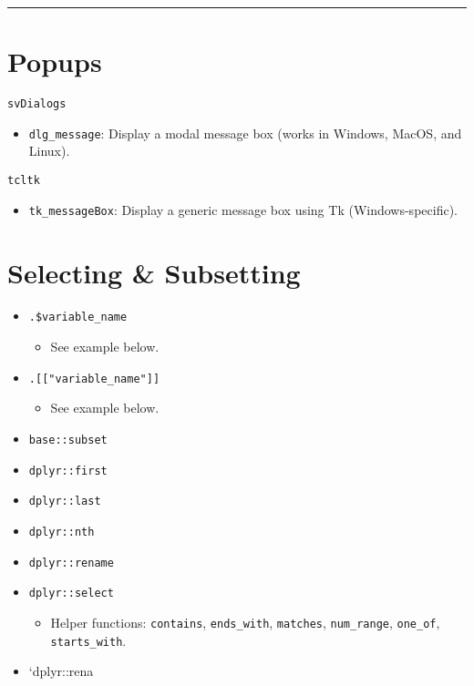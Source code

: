 \documentclass[]{book}
\providecommand{\tightlist}{%
  \setlength{\itemsep}{0pt}\setlength{\parskip}{0pt}}
\begin{document}
\begin{center}\rule{0.5\linewidth}{\linethickness}\end{center}

\hypertarget{popups}{%
\section{Popups}\label{popups}}

\texttt{svDialogs}

\begin{itemize}
\tightlist
\item
  \texttt{dlg\_message}: Display a modal message box (works in Windows, MacOS, and Linux).
\end{itemize}

\texttt{tcltk}

\begin{itemize}
\tightlist
\item
  \texttt{tk\_messageBox}: Display a generic message box using Tk (Windows-specific).
\end{itemize}

\hypertarget{selecting-subsetting}{%
\section{Selecting \& Subsetting}\label{selecting-subsetting}}

\begin{itemize}
\tightlist
\item
  \texttt{.\$variable\_name}

  \begin{itemize}
  \tightlist
  \item
    See example below.
  \end{itemize}
\item
  \texttt{.{[}{[}"variable\_name"{]}{]}}

  \begin{itemize}
  \tightlist
  \item
    See example below.
  \end{itemize}
\item
  \texttt{base::subset}
\item
  \texttt{dplyr::first}
\item
  \texttt{dplyr::last}
\item
  \texttt{dplyr::nth}
\item
  \texttt{dplyr::rename}
\item
  \texttt{dplyr::select}

  \begin{itemize}
  \tightlist
  \item
    Helper functions: \texttt{contains}, \texttt{ends\_with}, \texttt{matches}, \texttt{num\_range}, \texttt{one\_of}, \texttt{starts\_with}.
  \end{itemize}
\item
  `dplyr::rena
\end{itemize}
\end{document}
